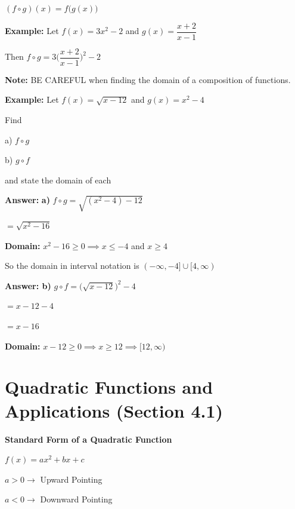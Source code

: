 \documentclass[12pt]{article}
\newenvironment{myindentpar}[1]%
     {\begin{list}{}%
             {\setlength{\leftmargin}{#1}}%
             \item[]%
     }
     {\end{list}}
\begin{document}
$(f \circ g)(x) = f \Big(g(x)\Big)$
\begin{myindentpar}{1cm}


\textbf{Example:} Let $f(x) = 3x^2-2$ and $g(x) = \dfrac{x+2}{x-1}$ 

Then $f \circ g = 3 \Big(\dfrac{x+2}{x-1} \Big)^2 -2$

\textbf{Note:} BE CAREFUL when finding the domain of a composition of functions. 
\end{myindentpar}
\begin{myindentpar}{2cm}
\textbf{Example:} Let $f(x) = \sqrt{x-12}$ and $g(x) = x^2-4$

Find 

a) $f \circ g$ 

b) $g \circ f$ 

and state the domain of each
\end{myindentpar}
\begin{myindentpar}{2.5cm}
\textbf{Answer:}
 \textbf{a)} $f \circ g = \sqrt{(x^2-4)-12}$

\hspace{3.3cm} $ = \sqrt{x^2-16}$

\textbf{Domain:} $x^2 - 16 \geq 0 \implies x\leq -4$ and $x \geq 4$

So the domain in interval notation is $(-\infty, -4] \cup [4, \infty)$

\textbf{Answer: b)} $g \circ f = \Big(\sqrt{x-12}\Big)^2 -4$

\hspace{3.3cm} $ = x-12 -4$

\hspace{3.3cm} $ = x-16$

\textbf{Domain:} $x - 12 \geq 0 \implies x \geq  12 \implies [12 , \infty)$
\end{myindentpar}


\section{Quadratic Functions and Applications (Section 4.1)}

\textbf{Standard Form of a Quadratic Function} 
\newline

\centerline{$f(x) = ax^{2} + bx  + c$}

\hspace{6cm} $a > 0 \to$ Upward Pointing

\hspace{6cm} $a < 0 \to$ Downward Pointing
\end{document}
